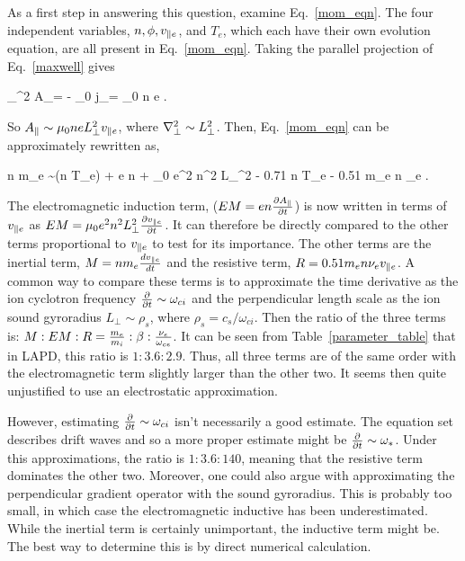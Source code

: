 As a first step in answering this question, examine Eq.~\ref{mom_eqn}. The four independent variables, $n, \phi, v_{\parallel e}$, and $T_e$, which each have their own evolution equation, are all
present in Eq.~\ref{mom_eqn}. Taking the parallel projection of Eq.~\ref{maxwell} gives

\beq
\label{Apar_eqn}
\grad_\perp^2 A_\para = - \mu_0 j_\para = \mu_0 n e \vpe.
\eeq

So $A_\parallel \sim \mu_0 n e L_\perp^2 v_{\parallel e}$, where $\nabla_\perp^2 \sim L_\perp^2$. Then, Eq.~\ref{mom_eqn} can be approximately rewritten as,

\beq
\label{mom_eqn_Apar}
n m_e  \sim \gradpar (n T_e) + e n \gradpar \phi + \mu_0 e^2 n^2 L_\perp^2  - 0.71 n \gradpar T_e - 0.51 m_e n \nu_e \vpe.
\eeq

The electromagnetic induction term, ($EM = e n \frac{\partial A_\parallel}{\partial t}$) is now written in terms of $v_{\parallel e}$ as $EM = \mu_0 e^2 n^2 L_\perp^2 \frac{\partial v_{\parallel e}}{\partial t}$. 
It can therefore be directly compared to the other terms proportional to $v_{\parallel e}$ to test for its importance. 
The other terms are the inertial term, $M = n m_e \frac{dv_{\parallel e}}{dt}$ and the resistive term, $R = 0.51 m_e n \nu_e v_{\parallel e}$. A common way to compare these terms is to approximate the time
derivative as the ion cyclotron frequency $\frac{\partial}{\partial t} \sim \omega_{ci}$ and the perpendicular length scale as the ion sound gyroradius $L_\perp \sim \rho_s$, where $\rho_s = c_s/\omega_{ci}$.
Then the ratio of the three terms is: $M:EM:R = \frac{m_e}{m_i}:\beta:\frac{\nu_{e}}{\omega_{ce}}$. It can be seen from Table~\ref{parameter_table} that in LAPD, this ratio is 
$1:3.6:2.9$. Thus, all three terms are of the same order with the electromagnetic term slightly larger than the other two. It seems then quite unjustified to use an electrostatic
approximation. 

However, estimating $\frac{\partial}{\partial t} \sim \omega_{ci}$ isn't necessarily a good estimate. The equation set describes drift waves and so a more proper estimate might be
$\frac{\partial}{\partial t} \sim \omega_{*}$. Under this approximations, the ratio is $1:3.6:140$, meaning that the resistive term dominates the other two. Moreover, one could also argue with
approximating the perpendicular gradient operator with the sound gyroradius. This is probably too small, in which case the electromagnetic inductive has been underestimated. While
the inertial term is certainly unimportant, the inductive term might be. The best way to determine this is by direct numerical calculation.
